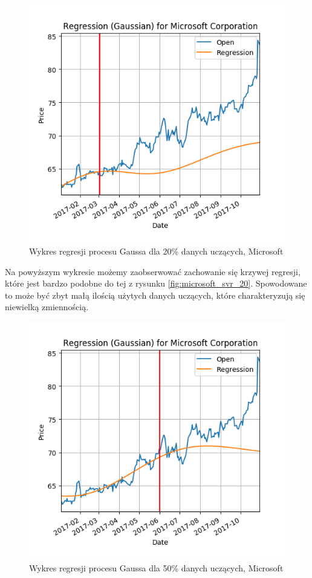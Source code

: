\begin{figure}[ht]
\centering
\includegraphics[scale=0.4]{pictures/plots/microsoft_gpr_20.png}
\caption{Wykres regresji procesu Gaussa dla 20\% danych uczących, Microsoft}
\label{fig:microsoft_gpr_20}
\end{figure}

Na powyższym wykresie możemy zaobserwować zachowanie się krzywej regresji, które jest bardzo podobne do tej z rysunku \ref{fig:microsoft_svr_20}.
Spowodowane to może być zbyt małą ilością użytych danych uczących, które charakteryzują się niewielką zmiennością.\\

\begin{figure}[ht]
\centering
\includegraphics[scale=0.4]{pictures/plots/microsoft_gpr_50.png}
\caption{Wykres regresji procesu Gaussa dla 50\% danych uczących, Microsoft}
\label{fig:microsoft_gpr_50}
\end{figure}

